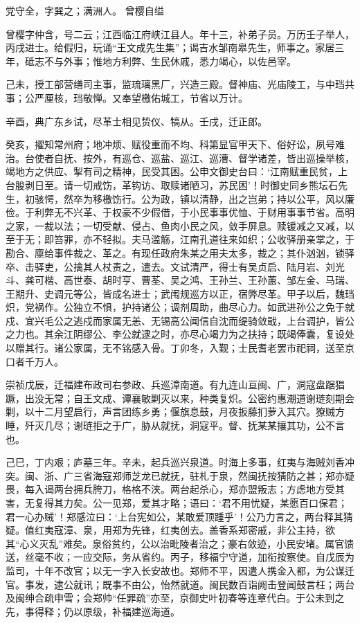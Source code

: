 \documentclass[]{article}
\begin{document}
党守全，字巽之；满洲人。 曾樱自缢

曾樱字仲含，号二云；江西临江府峡江县人。年十三，补弟子员。万历壬子举人，丙戌进士。给假归，玩诵``王文成先生集''；谒吉水邹南皋先生，师事之。家居三年，砥志不与外事；惟地方利弊、生民休戚，悉力竭心，以佐邑宰。

己未，授工部营缮司主事，监琉璃黑厂，兴造三殿。督神庙、光庙陵工，与中珰共事；公严厘核，珰敬惮。又奉望檄佑城工，节省以万计。

辛酉，典广东乡试，尽革士相见贽仪、犒从。壬戌，迁正郎。

癸亥，擢知常州府；地冲烦、赋役重而不均、科第显官甲天下、俗好讼，夙号难治。台使者自抚、按外，有巡仓、巡盐、巡江、巡漕、督学诸差，皆出巡操举核，竭地方之供应、掣有司之精神，民受其困。公申文御史台曰：`江南赋重民贫，上台朘剥日至。请一切戒饬，革钩访、取赎诸陋习，苏民困'！时御史同乡熊坛石先生，初骇愕，然卒为移檄饬行。公为政，镇以清静，出之岂弟；持以公平，风以廉俭。于利弊无不兴革、于权豪不少假借，于小民事事优恤、于财用事事节省。高明之家，一裁以法；一切受献、侵占、鱼肉小民之风，敛手屏息。赎锾减之又减，以至于无；即笞罪，亦不轻拟。夫马滥觞，江南孔道往来如织；公收驿册亲掌之，于勘合、廪给事件裁之、革之。有现任政府朱某之用夫太多，裁之；其仆汹汹，锁驿卒、击驿吏，公擒其人杖责之，遣去。文试清严，得士有吴贞启、陆月岩、刘光斗、龚可楷、高世泰、胡时亨、曹荃、吴之鸿、王孙兰、王孙蕙、邹左金、马瑞、王期升、史调元等公，皆成名进士；武闱规巡方以正，宿弊尽革。甲子以后，魏珰炽，党祸作。公独立不惧，护持诸公；调剂周助，曲尽心力。如武进孙公之免于就戍、宜兴毛公之逃戍而家属无恙、无锡高公闻信自沈而缇骑敛戢，上台调护，皆公之力也。其余江阴缪公、李公就逮之时，亦尽心竭力为之扶持；既竭俸囊，复设处以赠其行。诸公家属，无不铭感入骨。丁卯冬，入觐；士民耆老罢市祀祠，送至京口者千万人。

崇祯戊辰，迁福建布政司右参政、兵巡漳南道。有九连山亘闽、广，洞寇盘踞猖蹶，出没无常；自王文成、谭襄敏剿灭以来，种类复炽。公密约惠潮道谢琏刻期会剿，以十二月望启行，声言团练乡勇；偃旗息鼓，月夜扳藤扪萝入其穴。獠贼方睡，歼灭几尽；谢琏拒之于广，胁从就抚，洞寇平。督、抚某某攘其功，公不言也。

己巳，丁内艰；庐墓三年。辛未，起兵巡兴泉道。时海上多事，红夷与海贼刘香冲突。闽、浙、广三省海寇郑师芝龙已就抚，驻札于泉，然闽抚按猜防之甚；郑亦疑畏，每入谒两台拥兵胯刀，格格不浃。两台起杀心，郑亦盟叛志；方虑地方受其害，无复得其力矣。公一见郑，爱其才略；语曰：`君不用忧疑，某愿百口保君；君一心办贼'！郑感泣曰：`上台宪如公，某敢爱顶踵乎'！公乃力言之，两台释其猜疑。值红夷寇漳、泉，用郑为先锋，红夷创去。盖香系郑密戚，非公主持，欲其``心义灭乱''难矣。泉俗贫约，公以治毗陵者治之；豪右敛迹，小民安堵。属官馈送，丝毫不收；一应交际，务从省约。丙子，移福宁守道，加衔按察使。自戊辰为监司，十年不改官；以无一字入长安故也。郑师不平，因遣人携金入都，为公谋迁官。事发，逮公就讯；既事不由公，怡然就道。闽民数百诣阙击登闻鼓言枉；两台及闽绅合疏申雪；会郑帅``任罪疏''亦至，京御史叶初春等连章代白。于公未到之先，事得释；仍以原级，补福建巡海道。
\end{document}
